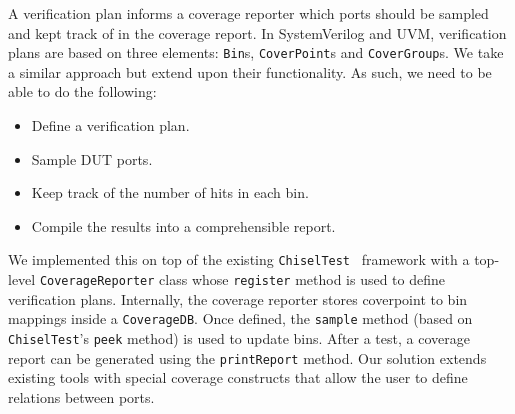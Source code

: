 \documentclass[conference]{IEEEtran}
\begin{document}
A verification plan informs a coverage reporter which ports should be sampled and kept track of in the coverage report. In SystemVerilog and UVM, verification plans are based on three elements: \texttt{Bin}s, \texttt{CoverPoint}s and \texttt{CoverGroup}s. We take a similar approach but extend upon their functionality. As such, we need to be able to do the following: %
\begin{itemize}
\item Define a verification plan. %
\item Sample DUT ports.%
\item Keep track of the number of hits in each bin.%
\item Compile the results into a comprehensible report.%
\end{itemize}

We implemented this on top of the existing \texttt{ChiselTest}~\cite{chisel:tester2} framework with a top-level \texttt{CoverageReporter} class whose \texttt{register} method is used to define verification plans. Internally, the coverage reporter stores coverpoint to bin mappings inside a \texttt{CoverageDB}. Once defined, the \texttt{sample} method (based on \texttt{ChiselTest}'s \texttt{peek} method) is used to update bins. After a test, a coverage report can be generated using the \texttt{printReport} method. Our solution extends existing tools with special coverage constructs that allow the user to define relations between ports. %
\end{document}
